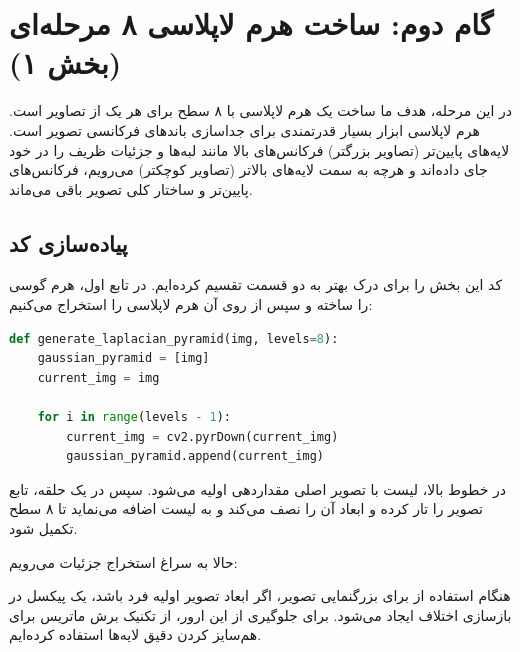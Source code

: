 \section{گام دوم: ساخت هرم لاپلاسی ۸ مرحله‌ای (بخش ۱)}

در این مرحله، هدف ما ساخت یک هرم لاپلاسی  با ۸ سطح برای هر یک از تصاویر است. هرم لاپلاسی ابزار بسیار قدرتمندی برای جداسازی باندهای فرکانسی تصویر است. لایه‌های پایین‌تر (تصاویر بزرگتر) فرکانس‌های بالا مانند لبه‌ها و جزئیات ظریف را در خود جای داده‌اند و هرچه به سمت لایه‌های بالاتر (تصاویر کوچکتر) می‌رویم، فرکانس‌های پایین‌تر و ساختار کلی تصویر باقی می‌ماند.

\begin{stepbox}
\end{stepbox}

\subsection{پیاده‌سازی کد}

کد این بخش را برای درک بهتر به دو قسمت تقسیم کرده‌ایم. در تابع اول، هرم گوسی را ساخته و سپس از روی آن هرم لاپلاسی را استخراج می‌کنیم:

\begin{codebox}
\begin{lstlisting}[language=Python]
def generate_laplacian_pyramid(img, levels=8):
    gaussian_pyramid = [img]
    current_img = img
    
    for i in range(levels - 1):
        current_img = cv2.pyrDown(current_img)
        gaussian_pyramid.append(current_img)
\end{lstlisting}
\end{codebox}

در خطوط بالا، لیست  با تصویر اصلی مقداردهی اولیه می‌شود. سپس در یک حلقه، تابع  تصویر را تار کرده و ابعاد آن را نصف می‌کند و به لیست اضافه می‌نماید تا ۸ سطح تکمیل شود.

حالا به سراغ استخراج جزئیات می‌رویم:

\begin{warnbox}
هنگام استفاده از  برای بزرگنمایی تصویر، اگر ابعاد تصویر اولیه فرد باشد، یک پیکسل در بازسازی اختلاف ایجاد می‌شود. برای جلوگیری از این ارور، از تکنیک برش  ماتریس برای هم‌سایز کردن دقیق لایه‌ها استفاده کرده‌ایم.
\end{warnbox}

